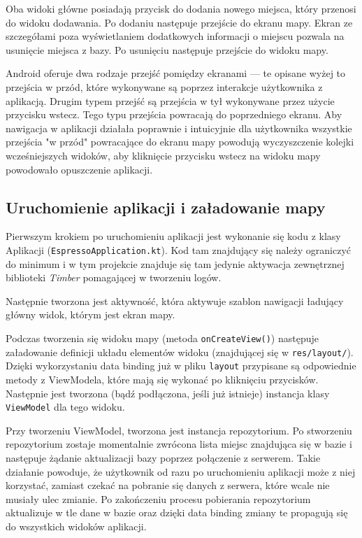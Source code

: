 \documentclass[polish,polish,a4paper,12pt]{article}
\begin{document}
		Oba widoki główne posiadają przycisk do dodania nowego miejsca, który przenosi do widoku dodawania. Po dodaniu następuje przejście do ekranu mapy. Ekran ze szczegółami poza wyświetlaniem dodatkowych informacji o miejscu pozwala na usunięcie miejsca z bazy. Po usunięciu następuje przejście do widoku mapy.

		Android oferuje dwa rodzaje przejść pomiędzy ekranami — te opisane wyżej to przejścia w przód, które wykonywane są poprzez interakcje użytkownika z aplikacją. Drugim typem przejść są przejścia w tył wykonywane przez użycie przycisku wstecz. Tego typu przejścia powracają do poprzedniego ekranu. Aby nawigacja w aplikacji działała poprawnie i intuicyjnie dla użytkownika wszystkie przejścia "w przód" powracające do ekranu mapy powodują wyczyszczenie kolejki wcześniejszych widoków, aby kliknięcie przycisku wstecz na widoku mapy powodowało opuszczenie aplikacji.

	\subsection{Uruchomienie aplikacji i załadowanie mapy}

	Pierwszym krokiem po uruchomieniu aplikacji jest wykonanie się kodu z klasy Aplikacji (\texttt{EspressoApplication.kt}). Kod tam znajdujący się należy ograniczyć do minimum i w tym projekcie znajduje się tam jedynie aktywacja zewnętrznej biblioteki \textit{Timber} pomagającej w tworzeniu logów.

	Następnie tworzona jest aktywność, która aktywuje szablon nawigacji ładujący główny widok, którym jest ekran mapy.

	Podczas tworzenia się widoku mapy (metoda \texttt{onCreateView()}) następuje załadowanie definicji układu elementów widoku (znajdującej się w \texttt{res/layout/}). Dzięki wykorzystaniu data binding już w pliku \texttt{layout} przypisane są odpowiednie metody z ViewModela, które mają się wykonać po kliknięciu przycisków. Następnie jest tworzona (bądź podłączona, jeśli już istnieje) instancja klasy \texttt{ViewModel} dla tego widoku.

	Przy tworzeniu ViewModel, tworzona jest instancja repozytorium. Po stworzeniu repozytorium zostaje momentalnie zwrócona lista miejsc znajdująca się w bazie i następuje żądanie aktualizacji bazy poprzez połączenie z serwerem. Takie działanie powoduje, że użytkownik od razu po uruchomieniu aplikacji może z niej korzystać, zamiast czekać na pobranie się danych z serwera, które wcale nie musiały ulec zmianie. Po zakończeniu procesu pobierania repozytorium aktualizuje w tle dane w bazie oraz dzięki data binding zmiany te propagują się do wszystkich widoków aplikacji.
\end{document}
